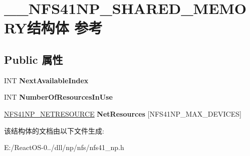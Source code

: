 \hypertarget{struct_____n_f_s41_n_p___s_h_a_r_e_d___m_e_m_o_r_y}{}\section{\+\_\+\+\_\+\+N\+F\+S41\+N\+P\+\_\+\+S\+H\+A\+R\+E\+D\+\_\+\+M\+E\+M\+O\+R\+Y结构体 参考}
\label{struct_____n_f_s41_n_p___s_h_a_r_e_d___m_e_m_o_r_y}
\subsection*{Public 属性}
\begin{DoxyCompactItemize}
\item 
\mbox{\label{struct_____n_f_s41_n_p___s_h_a_r_e_d___m_e_m_o_r_y_acaec7a589acfc42fe094f6eba768b11a}} 
I\+NT {\bfseries Next\+Available\+Index}
\item 
\mbox{\label{struct_____n_f_s41_n_p___s_h_a_r_e_d___m_e_m_o_r_y_a83291c14cd66b60c13e18943108c45c4}} 
I\+NT {\bfseries Number\+Of\+Resources\+In\+Use}
\item 
\mbox{\label{struct_____n_f_s41_n_p___s_h_a_r_e_d___m_e_m_o_r_y_aa72c3e83b93f84d7815d58b08a2e567a}} 
\hyperlink{struct_____n_f_s41_n_p___n_e_t_r_e_s_o_u_r_c_e}{N\+F\+S41\+N\+P\+\_\+\+N\+E\+T\+R\+E\+S\+O\+U\+R\+CE} {\bfseries Net\+Resources} \mbox{[}N\+F\+S41\+N\+P\+\_\+\+M\+A\+X\+\_\+\+D\+E\+V\+I\+C\+ES\mbox{]}
\end{DoxyCompactItemize}


该结构体的文档由以下文件生成\+:\begin{DoxyCompactItemize}
\item 
E\+:/\+React\+O\+S-\/0../dll/np/nfs/nfs41\+\_\+np.\+h\end{DoxyCompactItemize}
